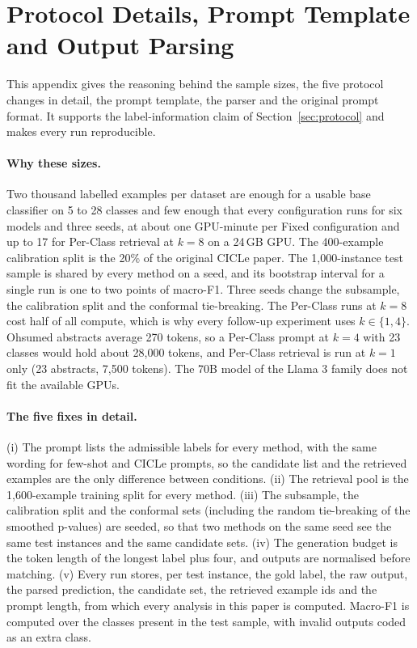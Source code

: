 
\section{Protocol Details, Prompt Template and Output Parsing}
\label{app:prompt}

This appendix gives the reasoning behind the sample sizes, the five protocol changes in detail, the prompt template, the parser and the original prompt format. It supports the label-information claim of Section~\ref{sec:protocol} and makes every run reproducible.

\paragraph{Why these sizes.}
Two thousand labelled examples per dataset are enough for a usable base classifier on 5 to 28 classes and few enough that every configuration runs for six models and three seeds, at about one GPU-minute per Fixed configuration and up to 17 for Per-Class retrieval at $k = 8$ on a 24\,GB GPU. The 400-example calibration split is the 20\% of the original CICLe paper. The 1,000-instance test sample is shared by every method on a seed, and its bootstrap interval for a single run is one to two points of macro-F1. Three seeds change the subsample, the calibration split and the conformal tie-breaking. The Per-Class runs at $k = 8$ cost half of all compute, which is why every follow-up experiment uses $k \in \{1, 4\}$. Ohsumed abstracts average 270 tokens, so a Per-Class prompt at $k = 4$ with 23 classes would hold about 28,000 tokens, and Per-Class retrieval is run at $k = 1$ only (23 abstracts, 7,500 tokens). The 70B model of the Llama 3 family does not fit the available GPUs.

\paragraph{The five fixes in detail.}
(i) The prompt lists the admissible labels for every method, with the same wording for few-shot and CICLe prompts, so the candidate list and the retrieved examples are the only difference between conditions. (ii) The retrieval pool is the 1,600-example training split for every method. (iii) The subsample, the calibration split and the conformal sets (including the random tie-breaking of the smoothed p-values) are seeded, so that two methods on the same seed see the same test instances and the same candidate sets. (iv) The generation budget is the token length of the longest label plus four, and outputs are normalised before matching. (v) Every run stores, per test instance, the gold label, the raw output, the parsed prediction, the candidate set, the retrieved example ids and the prompt length, from which every analysis in this paper is computed. Macro-F1 is computed over the classes present in the test sample, with invalid outputs coded as an extra class.

